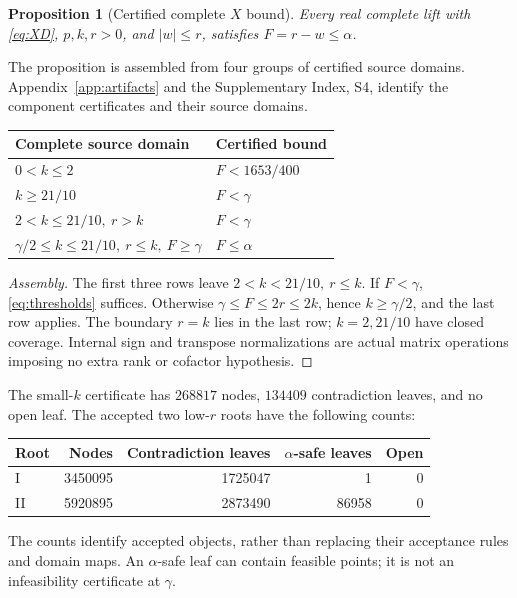 \documentclass[11pt,reqno]{amsart}
\newtheorem{proposition}[theorem]{Proposition}
\theoremstyle{definition}
\theoremstyle{remark}
\newcommand{\gam}{\gamma}
\begin{document}
\begin{proposition}[Certified complete \(X\) bound]\label{prop:X}
Every real complete lift with \eqref{eq:XD}, \(p,k,r>0\), and
\(|w|\le r\), satisfies \(F=r-w\le\alpha\).
\end{proposition}

The proposition is assembled from four groups of certified source domains.
Appendix~\ref{app:artifacts} and the Supplementary Index, S4,
identify the component certificates and their source domains.
\begin{center}
\begin{tabular}{@{}p{.53\linewidth}p{.33\linewidth}@{}}
\toprule
Complete source domain&Certified bound\\
\midrule
\(0<k\le2\)&\(F<1653/400\)\\
\(k\ge21/10\)&\(F<\gam\)\\
\(2<k\le21/10,\ r>k\)&\(F<\gam\)\\
\(\gam/2\le k\le21/10,\ r\le k,\ F\ge\gam\)&\(F\le\alpha\)\\
\bottomrule
\end{tabular}
\end{center}

\begin{proof}[Assembly]
The first three rows leave \(2<k<21/10,\ r\le k\).
If \(F<\gam\), \eqref{eq:thresholds} suffices. Otherwise
\(\gam\le F\le2r\le2k\), hence \(k\ge\gam/2\), and the last row
applies. The boundary \(r=k\) lies in the last row; \(k=2,21/10\)
have closed coverage. Internal sign and transpose normalizations are
actual matrix operations imposing no extra rank or cofactor hypothesis.
\end{proof}

The small-\(k\) certificate has \(268817\) nodes, \(134409\)
contradiction leaves, and no open leaf. The accepted two low-\(r\)
roots have the following counts:
\begin{center}
\begin{tabular}{@{}lrrrr@{}}
\toprule
Root&Nodes&Contradiction leaves&\(\alpha\)-safe leaves&Open\\
\midrule
I&3450095&1725047&1&0\\
II&5920895&2873490&86958&0\\
\bottomrule
\end{tabular}
\end{center}
The counts identify accepted objects, rather than replacing their
acceptance rules and domain maps. An \(\alpha\)-safe leaf can contain
feasible points; it is not an infeasibility certificate at \(\gam\).
\end{document}
